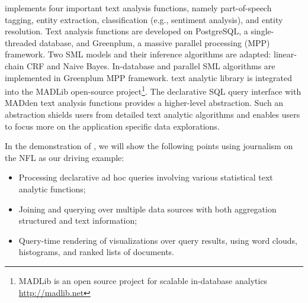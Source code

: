 {\system} implements four important text analysis functions, namely  
part-of-speech tagging, entity extraction, classification 
(e.g., sentiment analysis), and entity resolution.
Text analysis functions are developed on PostgreSQL, 
a single-threaded database, and Greenplum, a massive parallel 
processing (MPP) framework. 
Two SML models and their inference algorithms are adapted: linear-chain 
CRF and Naive Bayes\cite{Wang:2008:BML:1453856.1453896}. 
In-database and parallel SML algorithms are implemented in Greenplum MPP framework.
{\system} text analytic library is integrated into the MADLib
open-source project\footnote{MADLib is an open source project for scalable in-database 
analytics \url{http://madlib.net}}.
The declarative SQL query interface with MADden text analysis functions 
provides a higher-level abstraction. Such an abstraction shields users from 
detailed text analytic algorithms and enables users to focus more on the 
application specific data explorations. 



In the demonstration of \system, we will show the 
following points using journalism on the NFL as our driving example:
\begin{itemize}[noitemsep]
\item Processing declarative ad hoc queries involving various statistical text analytic functions;
\item Joining and querying over multiple data sources with both aggregation structured and text information;
\item Query-time rendering of visualizations over query results, using 
word clouds, histograms, and ranked lists of documents.
\end{itemize}

